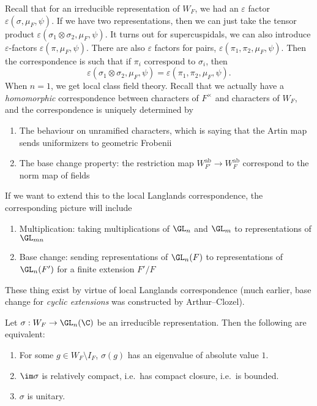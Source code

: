 \documentclass[a4paper]{article}
\newcommand\ab{\mathrm{ab}}
\begin{document}
Recall that for an irreducible representation of $W_F$, we had an $\varepsilon$ factor $\varepsilon(\sigma, \mu_F, \psi)$. If we have two representations, then we can just take the tensor product $\varepsilon(\sigma_1 \otimes \sigma_2, \mu_F, \psi)$. It turns out for supercuspidals, we can also introduce $\varepsilon$-factors $\varepsilon(\pi, \mu_F, \psi)$. There are also $\varepsilon$ factors for pairs, $\varepsilon(\pi_1, \pi_2, \mu_F, \psi)$. Then the correspondence is such that if $\pi_i$ correspond to $\sigma_i$, then
\[
  \varepsilon(\sigma_1 \otimes \sigma_2, \mu_F, \psi) = \varepsilon(\pi_1, \pi_2, \mu_F, \psi).
\]
When $n = 1$, we get local class field theory. Recall that we actually have a \emph{homomorphic} correspondence between characters of $F^\times$ and characters of $W_F$, and the correspondence is uniquely determined by
\begin{enumerate}
  \item The behaviour on unramified characters, which is saying that the Artin map sends uniformizers to geometric Frobenii
  \item The base change property: the restriction map $W_{F'}^{\ab} \to W_F^{\ab}$ correspond to the norm map of fields
\end{enumerate}
If we want to extend this to the local Langlands correspondence, the corresponding picture will include
\begin{enumerate}
  \item Multiplication: taking multiplications of $\GL_n$ and $\GL_m$ to representations of $\GL_{mn}$
  \item Base change: sending representations of $\GL_n(F)$ to representations of $\GL_n(F')$ for a finite extension $F'/F$
\end{enumerate}
These thing exist by virtue of local Langlands correspondence (much earlier, base change for \emph{cyclic extensions} was constructed by Arthur--Clozel).

\begin{prop}
  Let $\sigma: W_F \to \GL_n(\C)$ be an irreducible representation. Then the following are equivalent:
  \begin{enumerate}
    \item For some $g \in W_F \setminus I_F$, $\sigma(g)$ has an eigenvalue of absolute value $1$.
    \item $\im \sigma$ is relatively compact, i.e.\ has compact closure, i.e.\ is bounded.
    \item $\sigma$ is unitary.
  \end{enumerate}
\end{prop}
\end{document}
